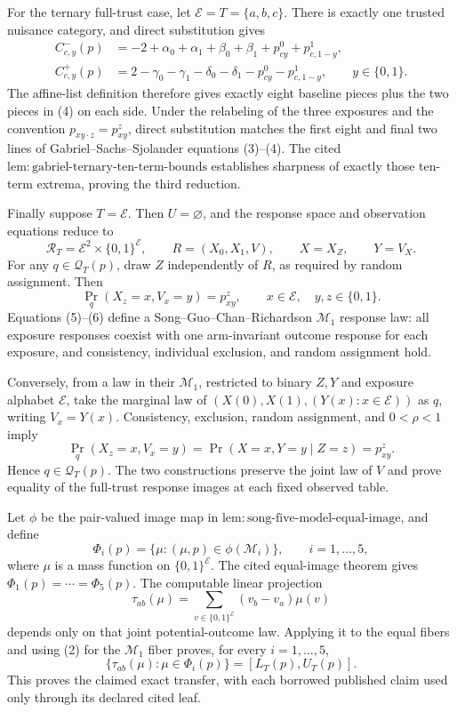 For the ternary full-trust case, let
\(\mathcal E=T=\{a,b,c\}\).  There is exactly one trusted nuisance category,
and direct substitution gives
\[
\begin{aligned}
 C^-_{c,y}(p)
 &=-2+\alpha_0+\alpha_1+\beta_0+\beta_1
      +p^0_{cy}+p^1_{c,1-y},\\
 C^+_{c,y}(p)
 &=2-\gamma_0-\gamma_1-\delta_0-\delta_1
      -p^0_{cy}-p^1_{c,1-y},
 \qquad y\in\{0,1\}.
\end{aligned} \tag{4}
\]
The affine-list definition therefore gives exactly eight baseline pieces
plus the two pieces in (4) on each side.  Under the relabeling of the three
exposures and the convention \(p_{xy\cdot z}=p^z_{xy}\), direct substitution
matches the first eight and final two lines of Gabriel--Sachs--Sjolander
equations (3)--(4).  The cited
\(\mathrm{lem{:}gabriel\mbox{-}ternary\mbox{-}ten\mbox{-}term\mbox{-}bounds}\)
establishes sharpness of exactly those ten-term extrema, proving the third
reduction.

Finally suppose \(T=\mathcal E\).  Then \(U=\varnothing\), and the response
space and observation equations reduce to
\[
 \mathcal R_T=\mathcal E^2\times\{0,1\}^{\mathcal E},
 \qquad R=(X_0,X_1,V),
 \qquad X=X_Z,
 \qquad Y=V_X. \tag{5}
\]
For any \(q\in\mathcal Q_T(p)\), draw \(Z\) independently of \(R\), as
required by random assignment.  Then
\[
 \Pr_q(X_z=x,V_x=y)=p^z_{xy},
 \qquad x\in\mathcal E,\quad y,z\in\{0,1\}. \tag{6}
\]
Equations (5)--(6) define a Song--Guo--Chan--Richardson
\(\mathcal M_1\) response law: all exposure responses coexist with one
arm-invariant outcome response for each exposure, and consistency,
individual exclusion, and random assignment hold.

Conversely, from a law in their \(\mathcal M_1\), restricted to binary
\(Z,Y\) and exposure alphabet \(\mathcal E\), take the marginal law of
\((X(0),X(1),(Y(x):x\in\mathcal E))\) as \(q\), writing \(V_x=Y(x)\).
Consistency, exclusion, random assignment, and \(0<\rho<1\) imply
\[
 \Pr_q(X_z=x,V_x=y)=\Pr(X=x,Y=y\mid Z=z)=p^z_{xy}.
\]
Hence \(q\in\mathcal Q_T(p)\).  The two constructions preserve the joint
law of \(V\) and prove equality of the full-trust response images at each
fixed observed table.

Let \(\phi\) be the pair-valued image map in
\(\mathrm{lem{:}song\mbox{-}five\mbox{-}model\mbox{-}equal\mbox{-}image}\),
and define
\[
 \Phi_i(p)=\{\mu:(\mu,p)\in\phi(\mathcal M_i)\},
 \qquad i=1,\ldots,5,
\]
where \(\mu\) is a mass function on \(\{0,1\}^{\mathcal E}\).  The cited
equal-image theorem gives
\(\Phi_1(p)=\cdots=\Phi_5(p)\).  The computable linear projection
\[
 \tau_{ab}(\mu)=\sum_{v\in\{0,1\}^{\mathcal E}}(v_b-v_a)\mu(v)
\]
depends only on that joint potential-outcome law.  Applying it to the equal
fibers and using (2) for the \(\mathcal M_1\) fiber proves, for every
\(i=1,\ldots,5\),
\[
 \{\tau_{ab}(\mu):\mu\in\Phi_i(p)\}=[L_T(p),U_T(p)].
\]
This proves the claimed exact transfer, with each borrowed published claim
used only through its declared cited leaf.


